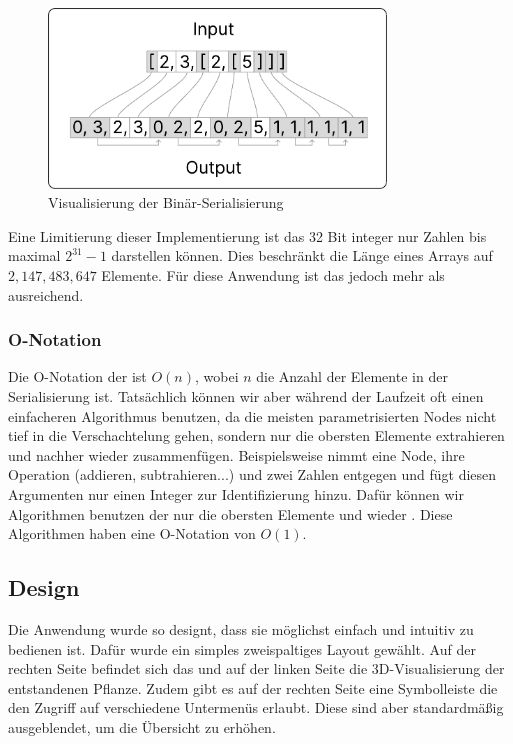 \documentclass[ngerman]{article}
\begin{document}
\begin{figure}[htbp]
  \centering
  \includegraphics[width=0.8\textwidth]{./graphics/ENCODING_SCHEME.pdf}
  \caption{Visualisierung der Binär-Serialisierung}
  \label{fig:encoding_scheme}
\end{figure}

Eine Limitierung dieser Implementierung ist das 32 Bit integer nur Zahlen bis maximal $2^{31}-1$ darstellen können. Dies beschränkt die Länge eines Arrays auf $2,147,483,647$ Elemente. Für diese Anwendung ist das jedoch mehr als ausreichend.

\subsubsection*{O-Notation}
Die O-Notation der  ist $O(n)$, wobei $n$ die Anzahl der Elemente in der Serialisierung ist. Tatsächlich können wir aber während der Laufzeit oft einen einfacheren Algorithmus benutzen, da die meisten parametrisierten Nodes nicht tief in die Verschachtelung gehen, sondern nur die obersten Elemente extrahieren und nachher wieder zusammenfügen. 
\br
Beispielsweise nimmt eine  Node, ihre Operation (addieren, subtrahieren...) und zwei Zahlen entgegen und fügt diesen Argumenten nur einen Integer zur Identifizierung hinzu. Dafür können wir Algorithmen benutzen der nur die obersten Elemente  und wieder .  Diese Algorithmen haben eine O-Notation von $O(1)$.

\pagebreak

\subsection{Design}

Die Anwendung wurde so designt, dass sie möglichst einfach und intuitiv zu bedienen ist. Dafür wurde ein simples zweispaltiges Layout gewählt. Auf der rechten Seite befindet sich das  und auf der linken Seite die 3D-Visualisierung der entstandenen Pflanze. Zudem gibt es auf der rechten Seite eine Symbolleiste die den Zugriff auf verschiedene Untermenüs erlaubt. Diese sind aber standardmäßig ausgeblendet, um die Übersicht zu erhöhen.
\end{document}
